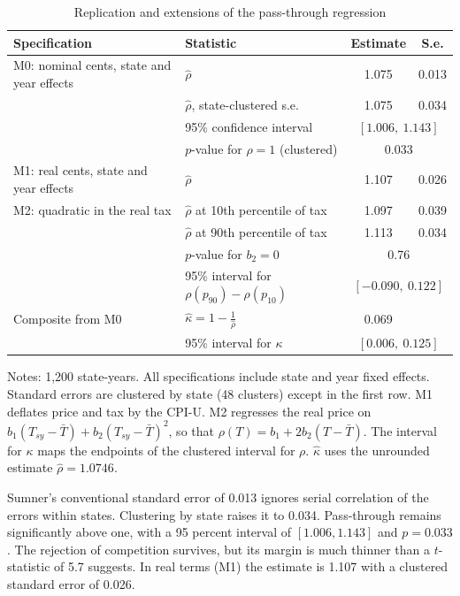 \begin{table}[htbp]
\centering
\begin{threeparttable}
\caption{Replication and extensions of the pass-through regression}
\label{tab:03-replication}
\small
\setlength{\tabcolsep}{5pt}
\begin{tabular}{@{}llcc@{}}
\toprule
Specification & Statistic & Estimate & S.e. \\
\midrule
M0: nominal cents, state and year effects & $\hat\rho$ & 1.075 & 0.013 \\
  & $\hat\rho$, state-clustered s.e. & 1.075 & 0.034 \\
  & 95\% confidence interval & \multicolumn{2}{c}{$[1.006,\ 1.143]$} \\
  & $p$-value for $\rho = 1$ (clustered) & \multicolumn{2}{c}{0.033} \\
\addlinespace
M1: real cents, state and year effects & $\hat\rho$ & 1.107 & 0.026 \\
\addlinespace
M2: quadratic in the real tax & $\hat\rho$ at 10th percentile of tax & 1.097 & 0.039 \\
  & $\hat\rho$ at 90th percentile of tax & 1.113 & 0.034 \\
  & $p$-value for $b_2 = 0$ & \multicolumn{2}{c}{0.76} \\
  & 95\% interval for $\rho(p_{90}) - \rho(p_{10})$ & \multicolumn{2}{c}{$[-0.090,\ 0.122]$} \\
\addlinespace
Composite from M0 & $\hat\kappa = 1 - \frac{1}{\hat\rho}$ & 0.069 & \\
  & 95\% interval for $\kappa$ & \multicolumn{2}{c}{$[0.006,\ 0.125]$} \\
\bottomrule
\end{tabular}
\begin{tablenotes}\footnotesize
\item Notes: 1,200 state-years. All specifications include state and year fixed effects. Standard errors are clustered
by state (48 clusters) except in the first row. M1 deflates price and tax by the CPI-U. M2 regresses the real price
on $b_1(T_{sy} - \bar T) + b_2(T_{sy} - \bar T)^2$, so that $\rho(T) = b_1 + 2b_2(T - \bar T)$. The interval for
$\kappa$ maps the endpoints of the clustered interval for $\rho$. $\hat\kappa$ uses the unrounded estimate
$\hat\rho = 1.0746$.
\end{tablenotes}
\end{threeparttable}
\end{table}

Sumner's conventional standard error of 0.013 ignores serial correlation of the errors within states. Clustering by
state raises it to 0.034. Pass-through remains significantly above one, with a 95 percent interval of $[1.006, 1.143]$
and $p = 0.033$. The rejection of competition survives, but its margin is much thinner than a $t$-statistic of 5.7
suggests. In real terms (M1) the estimate is 1.107 with a clustered standard error of 0.026.


